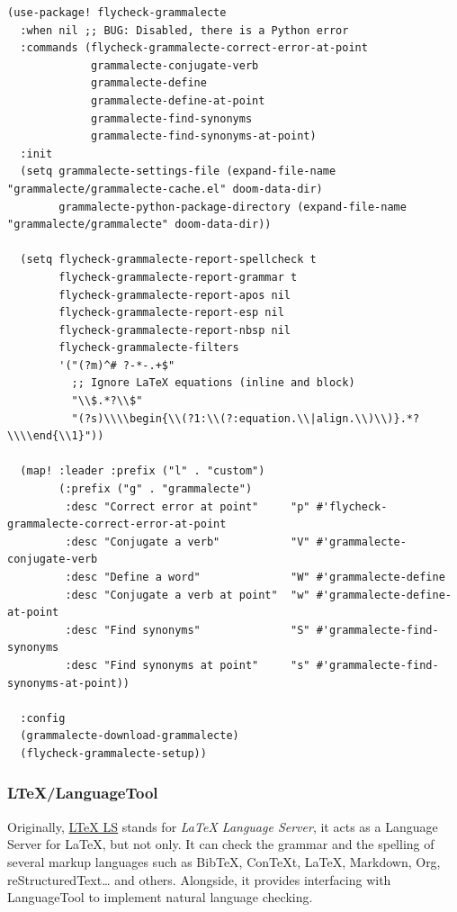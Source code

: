 \documentclass[11pt]{article}
\begin{document}
\begin{verbatim}
(use-package! flycheck-grammalecte
  :when nil ;; BUG: Disabled, there is a Python error
  :commands (flycheck-grammalecte-correct-error-at-point
             grammalecte-conjugate-verb
             grammalecte-define
             grammalecte-define-at-point
             grammalecte-find-synonyms
             grammalecte-find-synonyms-at-point)
  :init
  (setq grammalecte-settings-file (expand-file-name "grammalecte/grammalecte-cache.el" doom-data-dir)
        grammalecte-python-package-directory (expand-file-name "grammalecte/grammalecte" doom-data-dir))

  (setq flycheck-grammalecte-report-spellcheck t
        flycheck-grammalecte-report-grammar t
        flycheck-grammalecte-report-apos nil
        flycheck-grammalecte-report-esp nil
        flycheck-grammalecte-report-nbsp nil
        flycheck-grammalecte-filters
        '("(?m)^# ?-*-.+$"
          ;; Ignore LaTeX equations (inline and block)
          "\\$.*?\\$"
          "(?s)\\\\begin{\\(?1:\\(?:equation.\\|align.\\)\\)}.*?\\\\end{\\1}"))

  (map! :leader :prefix ("l" . "custom")
        (:prefix ("g" . "grammalecte")
         :desc "Correct error at point"     "p" #'flycheck-grammalecte-correct-error-at-point
         :desc "Conjugate a verb"           "V" #'grammalecte-conjugate-verb
         :desc "Define a word"              "W" #'grammalecte-define
         :desc "Conjugate a verb at point"  "w" #'grammalecte-define-at-point
         :desc "Find synonyms"              "S" #'grammalecte-find-synonyms
         :desc "Find synonyms at point"     "s" #'grammalecte-find-synonyms-at-point))

  :config
  (grammalecte-download-grammalecte)
  (flycheck-grammalecte-setup))
\end{verbatim}

\subsubsection{LTeX/LanguageTool}
\label{sec:orgf829bf4}
Originally, \href{https://valentjn.github.io/ltex/index.html}{LTeX LS} stands for \emph{\LaTeX{} Language Server}, it acts as a Language
Server for \LaTeX{}, but not only. It can check the grammar and the spelling of
several markup languages such as BibTeX, ConTeXt, \LaTeX{}, Markdown, Org,
reStructuredText\ldots{} and others. Alongside, it provides interfacing with
LanguageTool to implement natural language checking.
\end{document}

